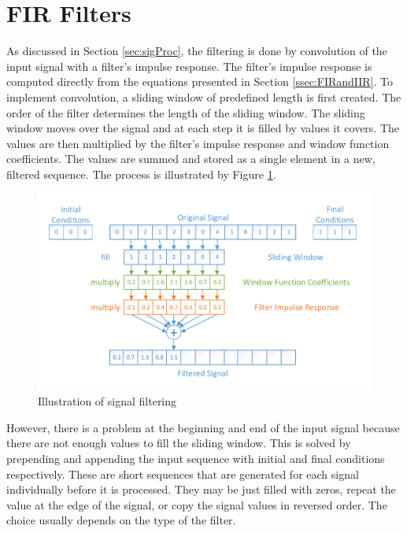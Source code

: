 \section{FIR Filters}
\label{sec:implFIRfilters}
As discussed in Section \ref{sec:sigProc}, the filtering is done by convolution of the input signal with a filter's impulse response. The filter's impulse response is computed directly from the equations presented in Section \ref{ssec:FIRandIIR}. To implement convolution, a sliding window of predefined length is first created. The order of the filter determines the length of the sliding window. The sliding window moves over the signal and at each step it is filled by values it covers. The values are then multiplied by the filter's impulse response and window function coefficients. The values are summed and stored as a single element in a new, filtered sequence. The process is illustrated by Figure \ref{fig:ImplFilter}.

\begin{figure}[htb]
	\centering
	\includegraphics[width=1\linewidth]{fig/implFilter.pdf}
	\caption{Illustration of signal filtering}
	\label{fig:ImplFilter}
\end{figure}

However, there is a problem at the beginning and end of the input signal because there are not enough values to fill the sliding window. This is solved by prepending and appending the input sequence with initial and final conditions respectively. These are short sequences that are generated for each signal individually before it is processed. They may be just filled with zeros, repeat the value at the edge of the signal, or copy the signal values in reversed order. The choice usually depends on the type of the filter.

